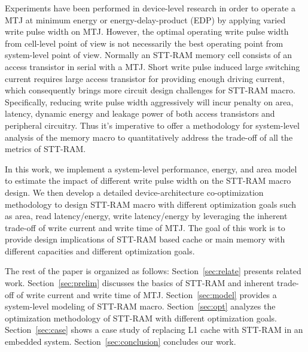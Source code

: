 Experiments have been performed in device-level research in order to operate a MTJ at minimum energy or energy-delay-product (EDP) by applying varied write pulse width on MTJ. However, the optimal operating write pulse width from cell-level point of view is not necessarily the best operating point from system-level point of view. Normally an STT-RAM memory cell consists of an access transistor in serial with a MTJ. Short write pulse induced large switching current requires large access transistor for providing enough driving current, which consequently brings more circuit design challenges for STT-RAM macro. Specifically, reducing write pulse width aggressively will incur penalty on area, latency, dynamic energy and leakage power of both access transistors and peripheral circuitry.  Thus it's imperative to offer a methodology for system-level analysis of the memory macro to quantitatively address the trade-off of all the metrics of STT-RAM.

In this work, we implement a system-level performance, energy, and area model to estimate the impact of different write pulse width on the STT-RAM macro design. We then develop a detailed device-architecture co-optimization methodology to design STT-RAM macro with different optimization goals such as area, read latency/energy, write latency/energy by leveraging the inherent trade-off of write current and write time of MTJ. The goal of this work is to provide design implications of STT-RAM based cache or main memory with different capacities and different optimization goals.

The rest of the paper is organized as follows: Section~\ref{sec:relate} presents related work. Section~\ref{sec:prelim} discusses the basics of STT-RAM and inherent trade-off of write current and write time of MTJ. Section~\ref{sec:model} provides a system-level modeling of STT-RAM macro. Section~\ref{sec:opt} analyzes the optimization methodology of STT-RAM with different optimization goals. Section~\ref{sec:case} shows a case study of replacing L1 cache with STT-RAM in an embedded system. Section~\ref{sec:conclusion} concludes our work.

\begin{comment}
Comment Paragraph
\end{comment} 